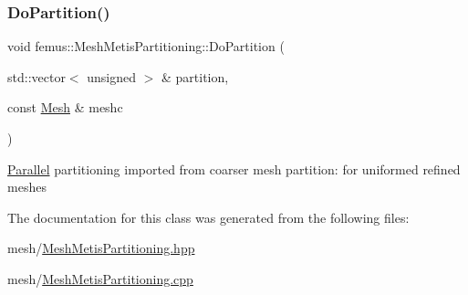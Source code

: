 \subsubsection{\texorpdfstring{Do\+Partition()}{DoPartition()}\hspace{0.1cm}{\footnotesize\ttfamily [2/2]}}
{\footnotesize\ttfamily void femus\+::\+Mesh\+Metis\+Partitioning\+::\+Do\+Partition (\begin{DoxyParamCaption}\item[{std\+::vector$<$ unsigned $>$ \&}]{partition,  }\item[{const \mbox{\hyperlink{classfemus_1_1_mesh}{Mesh}} \&}]{meshc }\end{DoxyParamCaption})}

\mbox{\hyperlink{namespacefemus_1_1_parallel}{Parallel}} partitioning imported from coarser mesh partition\+: for uniformed refined meshes 

The documentation for this class was generated from the following files\+:\begin{DoxyCompactItemize}
\item 
mesh/\mbox{\hyperlink{_mesh_metis_partitioning_8hpp}{Mesh\+Metis\+Partitioning.\+hpp}}\item 
mesh/\mbox{\hyperlink{_mesh_metis_partitioning_8cpp}{Mesh\+Metis\+Partitioning.\+cpp}}\end{DoxyCompactItemize}
